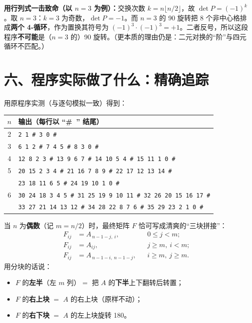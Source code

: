 \documentclass[11pt,a4paper,UTF8]{ctexart}
\begin{document}
\begin{warnbox}
\textbf{用行列式一击致命（以 $n=3$ 为例）：}交换次数 $k=n\lfloor n/2\rfloor$，故 $\det P=(-1)^{k}$。取 $n=3$：$k=3$ 为奇数，$\det P=-1$。而 $n=3$ 的 90\textdegree{} 旋转把 8 个非中心格排成\textbf{两个 4-循环}，作为置换其符号为 $(-1)^{3}\cdot(-1)^{3}=+1$。二者反号，所以这段程序\textbf{不可能}是（$n=3$ 的）90\textdegree{} 旋转。（更本质的理由仍是：二元对换的“阶”与四元循环不匹配。）
\end{warnbox}

\section*{六、程序实际做了什么：精确追踪}

用原程序实测（与逐句模拟一致）得到：

\begin{center}
\renewcommand{\arraystretch}{1.28}
\begin{tabular}{@{}c l@{}}
\toprule
$n$ & 输出（每行以 “\#\ ” 结尾）\\
\midrule
2 & \texttt{2 1 \# 3 0 \#}\\
3 & \texttt{6 1 2 \# 7 4 5 \# 8 3 0 \#}\\
4 & \texttt{12 8 2 3 \# 13 9 6 7 \# 14 10 5 4 \# 15 11 1 0 \#}\\
5 & \texttt{20 15 2 3 4 \# 21 16 7 8 9 \# 22 17 12 13 14 \#}\\
  & \texttt{23 18 11 6 5 \# 24 19 10 1 0 \#}\\
6 & \texttt{30 24 18 3 4 5 \# 31 25 19 9 10 11 \# 32 26 20 15 16 17 \#}\\
  & \texttt{33 27 21 14 13 12 \# 34 28 22 8 7 6 \# 35 29 23 2 1 0 \#}\\
\bottomrule
\end{tabular}
\end{center}

当 $n$ 为\textbf{偶数}（记 $m=n/2$）时，最终矩阵 $F$ 恰可写成清爽的“三块拼接”：
\[
\boxed{
\begin{aligned}
F_{ij}&=A_{\,n-1-j,\ i}, && 0\le j<m;\\[2pt]
F_{ij}&=A_{ij}, && j\ge m,\ i<m;\\[2pt]
F_{ij}&=A_{\,n-1-i,\ n-1-j}, && i\ge m,\ j\ge m.
\end{aligned}}
\]
用分块的话说：
\begin{itemize}
\item $F$ 的\textbf{左半}（左 $m$ 列）$=$ 把 $A$ 的\textbf{下半}上下翻转后转置；
\item $F$ 的\textbf{右上块} $=$ $A$ 的右上块（原样不动）；
\item $F$ 的\textbf{右下块} $=$ $A$ 的左上块旋转 180\textdegree。
\end{itemize}
\end{document}
